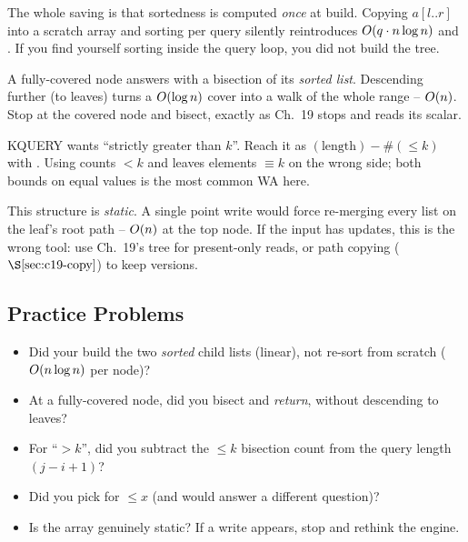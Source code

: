 \begin{warningbox}
The whole saving is that sortedness is computed \emph{once} at build.  Copying \(a[l..r]\) into a scratch array and sorting per query silently reintroduces \(O(q\cdot n\log n)\) and \tle.  If you find yourself sorting inside the query loop, you did not build the tree.
\end{warningbox}

\begin{warningbox}
A fully-covered node answers with a bisection of its \emph{sorted list}.  Descending further (to leaves) turns a \(O(\log n)\) cover into a walk of the whole range -- \(O(n)\).  Stop at the covered node and bisect, exactly as Ch.~19 stops and reads its scalar.
\end{warningbox}

\begin{warningbox}
KQUERY wants ``strictly greater than \(k\)''.  Reach it as \((\text{length})-\#(\le k)\) with .  Using  counts \(<k\) and leaves elements \(\equiv k\) on the wrong side; both bounds on equal values is the most common WA here.
\end{warningbox}

\begin{warningbox}
This structure is \emph{static}.  A single point write would force re-merging every list on the leaf's root path -- \(O(n)\) at the top node.  If the input has updates, this is the wrong tool: use Ch.~19's tree for present-only reads, or path copying (\(\secref{c19-copy}\)) to keep versions.
\end{warningbox}

\subsection{Practice Problems}

\begin{stuckbox}
\begin{itemize}[nosep,leftmargin=1.4em]
  \item Did your build  the two \emph{sorted} child lists (linear), not re-sort from scratch (\(O(n\log n)\) per node)?
  \item At a fully-covered node, did you bisect and \emph{return}, without descending to leaves?
  \item For ``\(>k\)'', did you subtract the \(\le k\) bisection count from the query length \((j-i+1)\)?
  \item Did you pick  for \(\le x\) (and would  answer a different question)?
  \item Is the array genuinely static?  If a write appears, stop and rethink the engine.
\end{itemize}
\end{stuckbox}


